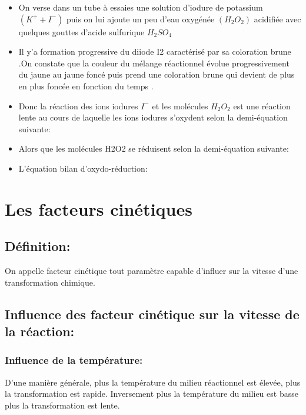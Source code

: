 \documentclass[12pt]{article}
\begin{document}
\begin{itemize}
	\item On verse dans un tube à essaies une solution d'iodure de potassium $(K^+ + I^-)$ puis on lui ajoute un peu d'eau oxygénée $(H_2O_2)$ acidifiée avec quelques gouttes d'acide sulfurique $H_2SO_4$
	\item Il y'a formation progressive du diiode I2 caractérisé par sa coloration brune .On constate que la couleur du mélange réactionnel
évolue progressivement du jaune au jaune foncé puis prend une coloration brune qui devient de plus en plus foncée en fonction du
temps .
\item Donc la réaction des ions iodures $I^-$ et les molécules $H_2O_2$ est une réaction lente au cours de laquelle les
	ions iodures s'oxydent selon la demi-équation suivante: 

\item Alors que les molécules H2O2 se réduisent selon la demi-équation suivante: 


\item L'équation bilan d'oxydo-réduction: 

\end{itemize}
\section{Les facteurs cinétiques }
\subsection{Définition: }
On appelle facteur cinétique tout paramètre capable d'influer sur la vitesse d'une transformation chimique.

\subsection{Influence des facteur cinétique sur la vitesse de la réaction:}
\subsubsection{Influence de la température: }

D'une manière générale, plus la température du milieu réactionnel est élevée, plus la transformation est rapide. Inversement plus la température du milieu est basse plus la transformation est lente.
\end{document}
